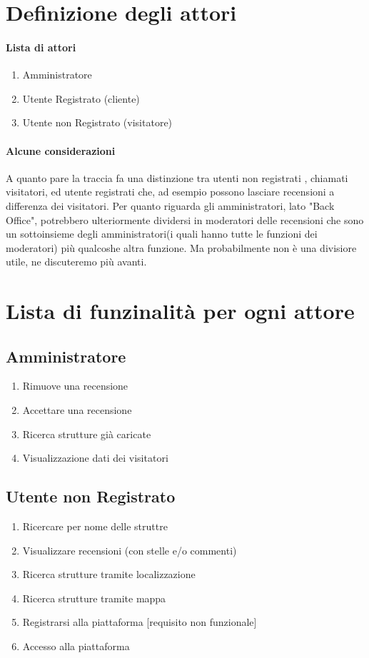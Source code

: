 \documentclass{article}
\begin{document}
\section{Definizione degli attori}
  \paragraph{Lista di attori}
  \begin{enumerate}
      \item Amministratore
      \item Utente Registrato (cliente)
      \item Utente non Registrato (visitatore)
  \end{enumerate}
  \paragraph{Alcune considerazioni}
  A quanto pare la traccia fa una distinzione tra utenti non registrati , chiamati visitatori, ed utente registrati
  che, ad esempio possono lasciare recensioni a differenza dei visitatori.
  Per quanto riguarda gli amministratori, lato "Back Office", potrebbero ulteriormente dividersi in moderatori 
  delle recensioni che sono un sottoinsieme degli amministratori(i quali hanno tutte le funzioni dei moderatori)
 più qualcoshe altra funzione. Ma probabilmente non è una divisiore utile, ne discuteremo più avanti.

 \section{Lista di funzinalità per ogni attore}
 \subsection{Amministratore}
 \begin{enumerate}
    \item Rimuove una recensione
    \item Accettare una recensione
    \item Ricerca strutture già caricate
    \item Visualizzazione dati dei visitatori
 \end{enumerate}
 \subsection{Utente non Registrato}
 \begin{enumerate}
     \item Ricercare per nome delle struttre
     \item Visualizzare recensioni (con stelle e/o commenti)
     \item Ricerca strutture tramite localizzazione
     \item Ricerca strutture tramite mappa
     \item Registrarsi alla piattaforma [requisito non funzionale] 
     \item Accesso alla piattaforma
 \end{enumerate}
\end{document}
